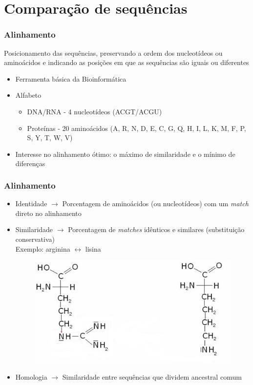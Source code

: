 \documentclass{beamer}
\begin{document}
	\section{Comparação de sequências}
		\begin{frame}\frametitle{Alinhamento}
			Posicionamento das sequências, preservando a ordem dos nucleotídeos ou aminoácidos e indicando as posições em que as sequências são iguais ou diferentes
			\begin{itemize}
				\item Ferramenta básica da Bioinformática
				\item Alfabeto
				\begin{itemize}
					\item DNA/RNA - 4 nucleotídeos (ACGT/ACGU)
					\item Proteínas - 20 aminoácidos (A, R, N, D, E, C, G, Q, H, I, L, K, M, F, P, S, Y, T, W, V)
				\end{itemize}
				\item Interesse no alinhamento ótimo: o máximo de similaridade e o mínimo de diferenças			
			\end{itemize}
		\end{frame}
	
		\begin{frame}\frametitle{Alinhamento}
			\begin{itemize}
				\item Identidade $\rightarrow$ Porcentagem de aminoácidos (ou nucleotídeos) com um \textit{match} direto no alinhamento
				\item Similaridade $\rightarrow$ Porcentagem de \textit{matches} idênticos e similares (substituição conservativa)\\
						\textcolor{ExecusharesGrey}{\footnotesize\hspace{1em}Exemplo: arginina $\leftrightarrow$ lisina}
						\begin{figure}[hbtp]
							\centering
							\includegraphics[scale=0.3]{img/arginina_to_lisina.png}
						\end{figure}
				\item Homologia $\rightarrow$ Similaridade entre sequências que dividem ancestral comum
			\end{itemize}
		\end{frame}
		
\end{document}
